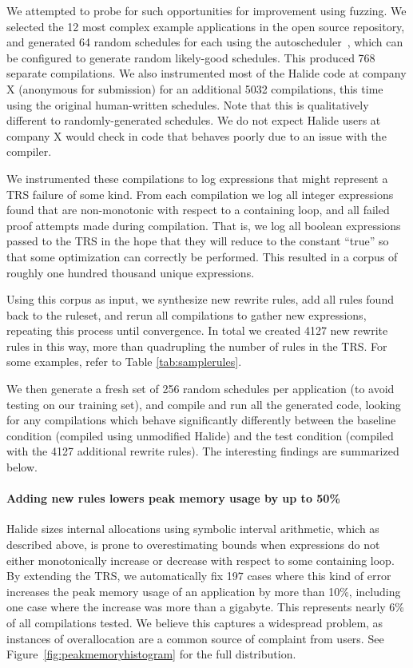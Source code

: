 \documentclass[acmsmall,review,anonymous]{acmart}\settopmatter{printfolios=true,printccs=false,printacmref=false}
\begin{document}
We attempted to probe for such opportunities for improvement using fuzzing. We selected the 12 most complex example applications in the open source repository, and generated 64 random schedules for each using the autoscheduler~\cite{Adams2019}, which can be configured to generate random likely-good schedules. This produced 768 separate compilations. We also instrumented most of the Halide code at company X (anonymous for submission) for an additional 5032 compilations, this time using the original human-written schedules. Note that this is qualitatively different to randomly-generated schedules. We do not expect Halide users at company X would check in code that behaves poorly due to an issue with the compiler.

We instrumented these compilations to log expressions that might represent a TRS failure of some kind. From each compilation we log all integer expressions found that are non-monotonic with respect to a containing loop, and all failed proof attempts made during compilation. That is, we log all boolean expressions passed to the TRS in the hope that they will reduce to the constant “true” so that some optimization can correctly be performed. This resulted in a corpus of roughly one hundred thousand unique expressions.

Using this corpus as input, we synthesize new rewrite rules, add all rules found back to the ruleset, and rerun all compilations to gather new expressions, repeating this process until convergence. In total we created 4127 new rewrite rules in this way, more than quadrupling the number of rules in the TRS. For some examples, refer to Table \ref{tab:samplerules}.

We then generate a fresh set of 256 random schedules per application (to avoid testing on our training set), and compile and run all the generated code, looking for any compilations which behave significantly differently between the baseline condition (compiled using unmodified Halide) and the test condition (compiled with the 4127 additional rewrite rules). The interesting findings are summarized below.

\paragraph{Adding new rules lowers peak memory usage by up to 50\%}
Halide sizes internal allocations using symbolic interval arithmetic,
which as described above, is prone to overestimating bounds when
expressions do not either monotonically increase or decrease with
respect to some containing loop. By extending the TRS, we
automatically fix 197 cases where this kind of error increases the
peak memory usage of an application by more than 10\%, including one
case where the increase was more than a gigabyte. This represents
nearly 6\% of all compilations tested. We believe this captures a
widespread problem, as instances of overallocation are a common source
of complaint from users. See Figure~\ref{fig:peakmemoryhistogram} for
the full distribution. 
\end{document}
